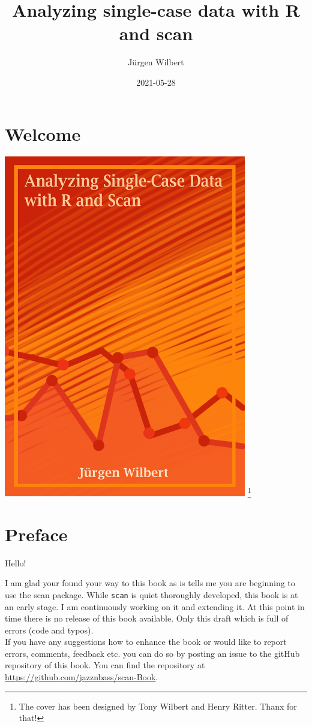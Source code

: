 \documentclass[
]{book}
\title{Analyzing single-case data with R and scan}
\author{Jürgen Wilbert}
\date{2021-05-28}
\begin{document}
\maketitle

{
\setcounter{tocdepth}{1}
\tableofcontents
}
\hypertarget{welcome}{%
\chapter*{Welcome}\label{welcome}}

\includegraphics[width=4.16667in,height=\textheight]{images/cover.png}
\footnote{The cover has been designed by Tony Wilbert and Henry Ritter. Thanx for that!}

\hypertarget{preface}{%
\chapter*{Preface}\label{preface}}

Hello!

I am glad your found your way to this book as is tells me you are beginning to use the scan package. While \texttt{scan} is quiet thoroughly developed, this book is at an early stage. I am continuously working on it and extending it. At this point in time there is no release of this book available. Only this draft which is full of errors (code and typos).\\
If you have any suggestions how to enhance the book or would like to report errors, comments, feedback etc. you can do so by posting an issue to the gitHub repository of this book. You can find the repository at \url{https://github.com/jazznbass/scan-Book}.
\end{document}
